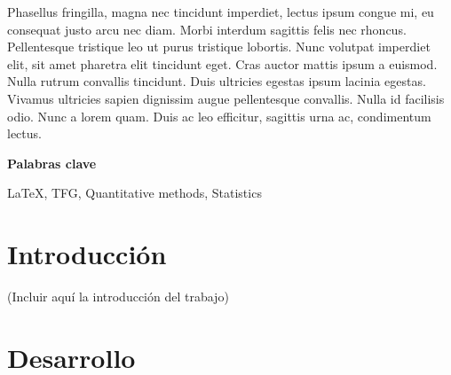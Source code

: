 \documentclass[12pt,a4paper]{report}
\numberwithin{figure}{section} %
\numberwithin{table}{section} %
\begin{document}
\vspace{12pt}

Phasellus fringilla, magna nec tincidunt imperdiet, lectus ipsum congue mi, eu consequat justo arcu nec diam. Morbi interdum sagittis felis nec rhoncus. Pellentesque tristique leo ut purus tristique lobortis. Nunc volutpat imperdiet elit, sit amet pharetra elit tincidunt eget. Cras auctor mattis ipsum a euismod. Nulla rutrum convallis tincidunt. Duis ultricies egestas ipsum lacinia egestas. Vivamus ultricies sapien dignissim augue pellentesque convallis. Nulla id facilisis odio. Nunc a lorem quam. Duis ac leo efficitur, sagittis urna ac, condimentum lectus.

\vspace{12pt}

{\fontsize{16}{19.2}\selectfont \textbf{Palabras clave}}

\vspace{12pt}

\LaTeX, TFG, Quantitative methods, Statistics


\newpage  


\section{Introducción}

\vspace{12pt}

(Incluir aquí la introducción del trabajo)

\vspace{12pt}

\section{Desarrollo}  
\end{document}
